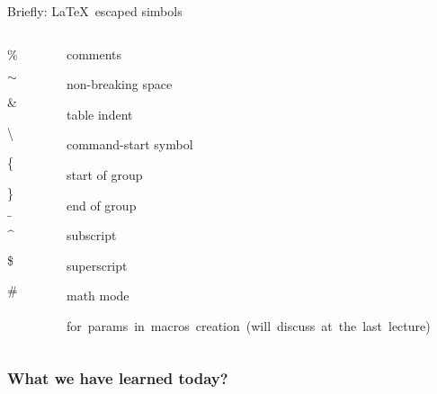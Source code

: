 \documentclass[14pt, aspectratio=169]{beamer}
\begin{document}
\begin{frame}{Briefly: \LaTeX\ escaped simbols}\relax
\begin{columns}
\begin{column}{0.1\textwidth}
\begin{center}
\vspace{-1ex}
    \%

    $\sim$ 
    
    \&
    
    \textbackslash 
    
    \{ 
    
    \} 
    
    $\_$ 
    
    $\^$
    
    \$ 
    
    \#
\end{center}
\end{column}
\begin{column}{0.9\textwidth}

\vspace{1ex} \incPause
comments \incPause

non-breaking space \incPause

table indent \incPause

command-start symbol \incPause

start of group \incPause

end of group \incPause

subscript \incPause

superscript \incPause

math mode \incPause

\hbox{for params in macros creation (will discuss at the last lecture)}

\end{column}
     
\end{columns}
\end{frame}

\begin{frame}\frametitle{What we have learned today?}
\tableofcontents
\end{frame}
\end{document}
